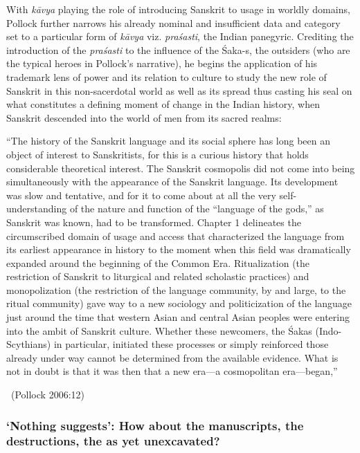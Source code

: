 With \textit{kāvya} playing the role of introducing Sanskrit to usage in worldly domains, Pollock further narrows his already nominal and insufficient data and category set to a particular form of \textit{kāvya} viz. \textit{praśasti}, the Indian panegyric. Crediting the introduction of the \textit{praśasti} to the influence of the Śaka-s, the outsiders (who are the typical heroes in Pollock’s narrative), he begins the application of his trademark lens of power and its relation to culture to study the new role of Sanskrit in this non-sacerdotal world as well as its spread thus casting his seal on what constitutes a defining moment of change in the Indian history, when Sanskrit descended into the world of men from its sacred realms:

\begin{myquote}
“The history of the Sanskrit language and its social sphere has long been an object of interest to Sanskritists, for this is a curious history that holds considerable theoretical interest. The Sanskrit cosmopolis did not come into being simultaneously with the appearance of the Sanskrit language. Its development was slow and tentative, and for it to come about at all the very self-understanding of the nature and function of the “language of the gods,” as Sanskrit was known, had to be transformed. Chapter 1 delineates the circumscribed domain of usage and access that characterized the language from its earliest appearance in history to the moment when this field was dramatically expanded around the beginning of the Common Era. Ritualization (the restriction of Sanskrit to liturgical and related scholastic practices) and monopolization (the restriction of the language community, by and large, to the ritual community) gave way to a new sociology and politicization of the language just around the time that western Asian and central Asian peoples were entering into the ambit of Sanskrit culture. Whether these newcomers, the Śakas (Indo-Scythians) in particular, initiated these processes or simply reinforced those already under way cannot be determined from the available evidence. What is not in doubt is that it was then that a new era—a cosmopolitan era—began,” 

~\hfill (Pollock 2006:12)
\end{myquote}


\vspace{-.4cm}

\subsubsection{‘Nothing suggests’: How about the manuscripts, the destructions, the as yet unexcavated?}

